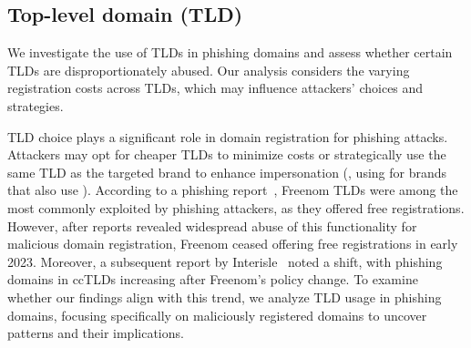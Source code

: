 \subsection{Top-level domain (TLD)}
\label{sec:tld_characteristics}

We investigate the use of TLDs in phishing domains %
and assess whether certain TLDs are disproportionately abused. 
Our analysis considers the varying registration costs across TLDs, which may influence attackers' choices and strategies.


TLD choice plays a significant role in domain registration for phishing attacks. Attackers may opt for cheaper TLDs to minimize costs or strategically use the same TLD as the targeted brand to enhance impersonation (\eg, using  for brands that also use ). 
According to a phishing report~\cite{Phishing18:online}, Freenom TLDs were among the most commonly exploited by phishing attackers, as they offered free registrations. 
However, after reports revealed widespread abuse of this functionality for malicious domain registration, Freenom ceased offering free registrations in early 2023.
Moreover, a subsequent report by Interisle~\cite{Phishing18:online} noted a shift, with phishing domains in ccTLDs increasing after Freenom's policy change. To examine whether our findings align with this trend, we analyze TLD usage in phishing domains, focusing specifically on maliciously registered domains to uncover patterns and their implications.




